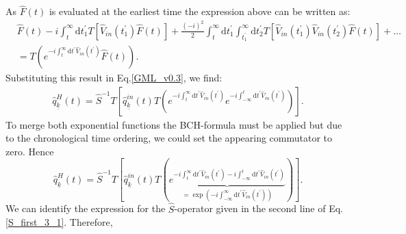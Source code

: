 \documentclass[12pt, titlepage]{article}
\begin{document}
As $ \hat{F}(t) $ is evaluated at the earliest time the expression above can be written as: 
\begin{equation}\label{Move_in_T_from_right}
\begin{split}
&
\hat{F}(t)\!
-\!
i\!
\int_{t}^{\infty}\! \!\mathrm{d}t^{\prime}_{1}
 T
 \left[ 
 \hat{V}_{in}(t^{\prime}_{1})
 \hat{F}(t)
 \right] \!
+\!
\frac{(-i)^{2}}{2}\!\!
\int_{t}^{\infty}\!  \mathrm{d}t^{\prime}_{1}
\int_{t^{\prime}_{1}}^{\infty}\!\!\mathrm{d}t^{\prime}_{2}
 T
 \left[ 
 \hat{V}_{in}(t^{\prime}_{1})\hat{V}_{in}(t^{\prime}_{2})
\hat{F}(t) 
 \right] 
+\ldots
\\
&=
T\left( 
 e^{-i\int_{t}^{\infty}\mathrm{d}t^{\prime} \hat{V}_{in}(t^{\prime})}
\hat{F}(t)
\right)
.
\end{split}
\end{equation} 
Substituting this result in Eq.\enskip\eqref{GML_v0.3}, we find:
\begin{equation}
\begin{split}
\hat{q}^{H}_{\underline{k}}(t)
=
\hat{S}^{-1} 
T
\left[
\hat{q}^{in}_{\underline{k}}(t)
T
\left( 
 e^{-i\int_{t}^{\infty}\mathrm{d}t^{\prime} \hat{V}_{in}(t^{\prime})}
 e^{-i\int_{-\infty}^{t}\mathrm{d}t^{\prime} \hat{V}_{in}(t^{\prime})}
\right) 
\right] 
.
\end{split}
\end{equation}
To merge both exponential functions the BCH-formula must be applied but due to the chronological time ordering, we could set the appearing commutator to zero. Hence
\begin{equation}\label{3rd_expression_for_Omega_H}
\hat{q}^{H}_{\underline{k}}(t)
=
\hat{S}^{-1} 
T
\left[
\hat{q}^{in}_{\underline{k}}(t)
T
\left( 
\underbrace{
 e^{-i\int_{t}^{\infty}\mathrm{d}t^{\prime} \hat{V}_{in}(t^{\prime})-i\int_{-\infty}^{t}\mathrm{d}t^{\prime} \hat{V}_{in}(t^{\prime})}
 }_{
 =\exp(-i\int_{-\infty}^{\infty}\mathrm{d}t^{\prime} \hat{V}_{in}(t^{\prime}))
 }
\right) 
\right]
.
\end{equation}
We can identify the expression for the $ \hat{S} $-operator given in the second line of Eq.\enskip\eqref{S_first_3_1}. Therefore,
\end{document}
